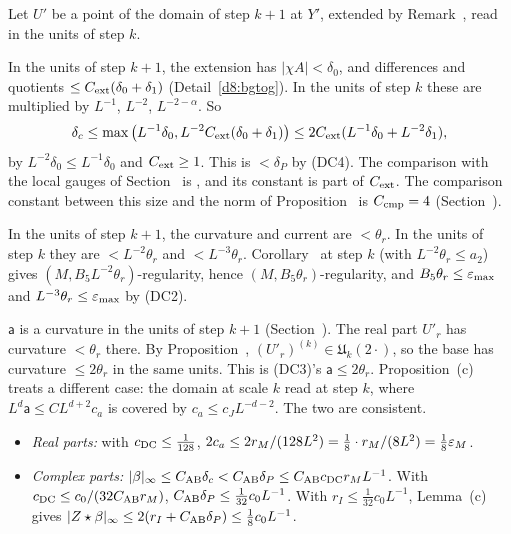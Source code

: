 \begin{detail}\label{d8:ix18}
Let $U'$ be a point of the domain of step $k+1$ at $Y'$, extended by Remark~, read in the units of step $k$.
\begin{step}[Size]
In the units of step $k+1$, the extension has $|\chi A|<\delta_0$, and differences and quotients $\le C_{\rm ext}(\delta_0+\delta_1)$ (Detail~\ref{d8:bgtog}). In the units of step $k$ these are multiplied by $L^{-1}$, $L^{-2}$, $L^{-2-\alpha}$. So
\[
\delta_c\le\max\big(L^{-1}\delta_0,L^{-2}C_{\rm ext}(\delta_0+\delta_1)\big)\le2C_{\rm ext}(L^{-1}\delta_0+L^{-2}\delta_1),
\]
by $L^{-2}\delta_0\le L^{-1}\delta_0$ and $C_{\rm ext}\ge1$. This is $<\delta_P$ by (DC4). The comparison with the local gauges of Section~ is , and its constant is part of $C_{\rm ext}$. The comparison constant between this size and the norm of Proposition~ is $C_{\rm cmp}=4$ (Section~).
\end{step}
\begin{step}
In the units of step $k+1$, the curvature and current are $<\theta_r$. In the units of step $k$ they are $<L^{-2}\theta_r$ and $<L^{-3}\theta_r$. Corollary~ at step $k$ (with $L^{-2}\theta_r\le a_2$) gives $(M,B_5L^{-2}\theta_r)$-regularity, hence $(M,B_5\theta_r)$-regularity, and $B_5\theta_r\le\varepsilon_{\max}$ and $L^{-3}\theta_r\le\varepsilon_{\max}$ by (DC2).
\end{step}
\begin{step}
$\mathsf a$ is a curvature in the units of step $k+1$ (Section~). The real part $U'_r$ has curvature $<\theta_r$ there. By Proposition~, $(U'_r)^{(k)}\in\mathfrak U_k(2\cdot)$, so the base has curvature $\le2\theta_r$ in the same units. This is (DC3)'s $\mathsf a\le2\theta_r$. Proposition~(c) treats a different case: the domain at scale $k$ read at step $k$, where $L^d\mathsf a\le CL^{d+2}c_a$ is covered by $c_a\le c_JL^{-d-2}$. The two are consistent.
\end{step}
\begin{step}[(DC5) arithmetic]
\begin{itemize}
\item \emph{Real parts:} with $c_{\rm DC}\le\frac1{128}$, $2c_a\le2r_M/(128L^2)=\frac18\cdot r_M/(8L^2)=\frac18\varepsilon_M$.
\item \emph{Complex parts:} $|\beta|_\infty\le C_{\rm AB}\delta_c<C_{\rm AB}\delta_P\le C_{\rm AB}c_{\rm DC}r_ML^{-1}$. With $c_{\rm DC}\le c_0/(32C_{\rm AB}r_M)$, $C_{\rm AB}\delta_P\le\frac1{32}c_0L^{-1}$. With $r_I\le\frac1{32}c_0L^{-1}$, Lemma~(c) gives $|Z\star\beta|_\infty\le2(r_I+C_{\rm AB}\delta_P)\le\frac18c_0L^{-1}$.

\end{itemize}
\end{step}
\end{detail}
